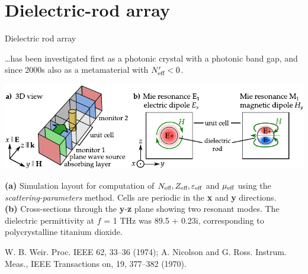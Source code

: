 \documentclass[t]{beamer} \usepackage[english]{babel} \usepackage[utf8]{inputenc} \usetheme{Frankfurt} %
\begin{document}
\section{Dielectric-rod array}
\begin{frame}{Dielectric rod array}	%

\vspace{-.6em}
\ldots has been investigated first as a photonic crystal with a photonic band gap, and since 2000s also as a metamaterial with $N_{\text{eff} }'<0$. 
\begin{tiny}\end{tiny}

\vspace{.3em}

\hfill\includegraphics[width=1\textwidth]{../img/ERods_1st_and_2nd_Mie_resonance_sketch.pdf}\hfill\;
\vspace{.3em}

\textbf{(a)} Simulation layout for computation of $N_{\text{eff} }, Z_{\text{eff} }, \varepsilon_{\text{eff} }$ and $\mu_{\text{eff} }$ using the \textit{scattering-parameters} method. Cells are periodic in the \textbf{x} and \textbf{y} directions. \\
\textbf{(b)} Cross-sections through the \textbf{y}-\textbf{z} plane showing two resonant modes. The dielectric permittivity at $f$ = 1 THz was 89.5 + 0.23i, corresponding to polycrystalline titanium dioxide.

\vfill
\begin{tiny}W. B. Weir. Proc. IEEE 62, 33–36 (1974); A. Nicolson and G. Ross. Instrum. Meas., IEEE Transactions on, 19, 377–382 (1970).\end{tiny}
\end{frame} 		%
\end{document}
